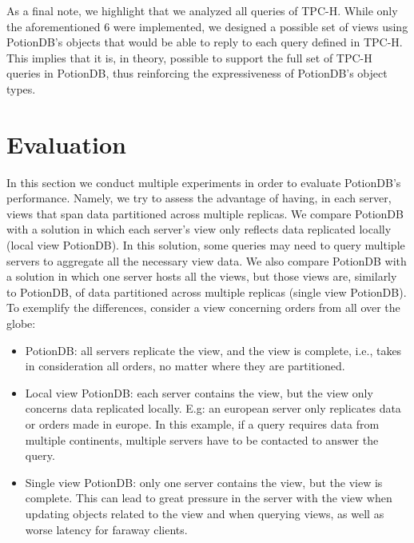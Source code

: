 \documentclass{vldb}
\newcommand{\grumbler}[2]{{\color{red}{\bf #1:} #2}}
\renewcommand{\grumbler}[2]{}
\newcommand{\andre}[1]{\grumbler{andre}{#1}}
\begin{document}
As a final note, we highlight that we analyzed all queries of TPC-H.
While only the aforementioned 6 were implemented, we designed a possible set of views using PotionDB's objects that would be able to reply to each query defined in TPC-H.
This implies that it is, in theory, possible to support the full set of TPC-H queries in PotionDB, thus reinforcing the expressiveness of PotionDB's object types.

\andre{Should I mention that maybe the triggers would need to be more expressive to support updating all of those views? Then again we're already allowing custom code on them...}

\section{Evaluation}

\andre{I added more text to this intro to explain the differences between the versions of PotionDB, but the text is much longer now. Old one is commented.}

In this section we conduct multiple experiments in order to evaluate PotionDB's performance.
Namely, we try to assess the advantage of having, in each server, views that span data partitioned across multiple replicas.
We compare PotionDB with a solution in which each server's view only reflects data replicated locally (local view PotionDB). In this solution, some queries may need to query multiple servers to aggregate all the necessary view data.
We also compare PotionDB with a solution in which one server hosts all the views, but those views are, similarly to PotionDB, of data partitioned across multiple replicas (single view PotionDB).
To exemplify the differences, consider a view concerning orders from all over the globe:
\begin{itemize}
	\item PotionDB: all servers replicate the view, and the view is complete, i.e., takes in consideration all orders, no matter where they are partitioned.
	\item Local view PotionDB: each server contains the view, but the view only concerns data replicated locally. E.g: an european server only replicates data or orders made in europe.
	In this example, if a query requires data from multiple continents, multiple servers have to be contacted to answer the query.
	\item Single view PotionDB: only one server contains the view, but the view is complete.
	This can lead to great pressure in the server with the view when updating objects related to the view and when querying views, as well as worse latency for faraway clients.	
\end{itemize}
\end{document}
